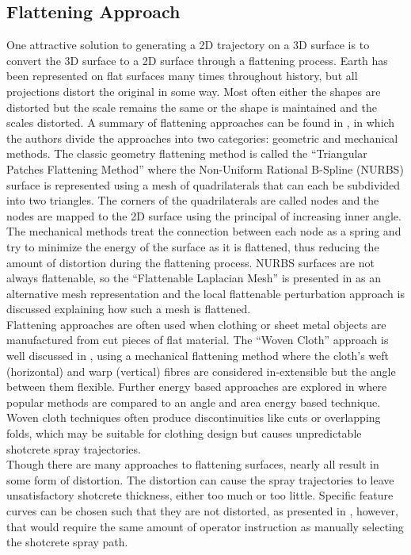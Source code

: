 \subsection{Flattening Approach}
One attractive solution to generating a 2D trajectory on a 3D surface is to convert the 3D surface to a 2D surface through a flattening process. Earth has been represented on flat surfaces many times throughout history, but all projections distort the original in some way. Most often either the shapes are distorted but the scale remains the same or the shape is maintained and the scales distorted. A summary of flattening approaches can be found in \cite{overflat}, in which the authors divide the approaches into two categories: geometric and mechanical methods. The classic geometry flattening method is called the ``Triangular Patches Flattening Method'' where the Non-Uniform Rational B-Spline (NURBS) surface is represented using a mesh of quadrilaterals that can each be subdivided into two triangles. The corners of the quadrilaterals are called nodes and the nodes are mapped to the 2D surface using the principal of increasing inner angle. The mechanical methods treat the connection between each node as a spring and try to minimize the energy of the surface as it is flattened, thus reducing the amount of distortion during the flattening process. NURBS surfaces are not always flattenable, so the ``Flattenable Laplacian Mesh'' is presented in \cite{toward} as an alternative mesh representation and the local flattenable perturbation approach is discussed explaining how such a mesh is flattened.\\

Flattening approaches are often used when clothing or sheet metal objects are manufactured from cut pieces of flat material. The ``Woven Cloth'' approach is well discussed in \cite{woven,freef}, using a mechanical flattening method where the cloth's weft (horizontal) and warp (vertical) fibres are considered in-extensible but the angle between them flexible. Further energy based approaches are explored in \cite{parameet} where popular methods are compared to an angle and area energy based technique. Woven cloth techniques often produce discontinuities like cuts or overlapping folds, which may be suitable for clothing design but causes unpredictable shotcrete spray trajectories.\\

Though there are many approaches to flattening surfaces, nearly all result in some form of distortion. The distortion can cause the spray trajectories to leave unsatisfactory shotcrete thickness, either too much or too little. Specific feature curves can be chosen such that they are not distorted, as presented in \cite{wwarp,wwarpp}, however, that would require the same amount of operator instruction as manually selecting the shotcrete spray path.\\

